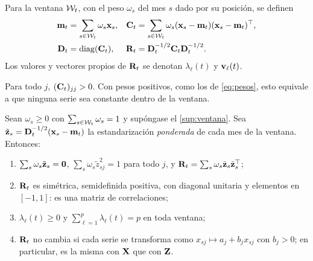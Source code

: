 \begin{definicion}\label{def:epca}
Para la ventana $\mathcal{W}_t$, con el peso $\omega_s$ del mes $s$ dado por su posición, se definen
\begin{equation}\label{eq:epca}
\begin{aligned}
  \mathbf{m}_t&=\sum_{s\in\mathcal{W}_t}\omega_s\mathbf{x}_s, &
  \mathbf{C}_t&=\sum_{s\in\mathcal{W}_t}\omega_s(\mathbf{x}_s-\mathbf{m}_t)(\mathbf{x}_s-\mathbf{m}_t)^{\top},\\
  \mathbf{D}_t&=\operatorname{diag}(\mathbf{C}_t), &
  \mathbf{R}_t&=\mathbf{D}_t^{-1/2}\mathbf{C}_t\mathbf{D}_t^{-1/2}.
\end{aligned}
\end{equation}
Los valores y vectores propios de $\mathbf{R}_t$ se denotan $\lambda_\ell(t)$ y $\mathbf{v}_\ell(t)$.
\end{definicion}

\begin{supuesto}\label{sup:ventana}
Para todo $j$, $(\mathbf{C}_t)_{jj}>0$. Con pesos positivos, como los de \cref{eq:pesos}, esto equivale a
que ninguna serie sea constante dentro de la ventana.
\end{supuesto}

\begin{proposicion}\label{prop:epca}
Sean $\omega_s\ge0$ con $\sum_{s\in\mathcal{W}_t}\omega_s=1$ y supóngase el \cref{sup:ventana}. Sea
$\tilde{\mathbf{z}}_s=\mathbf{D}_t^{-1/2}(\mathbf{x}_s-\mathbf{m}_t)$ la estandarización \emph{ponderada} de cada mes de la
ventana. Entonces:
\begin{enumerate}[label=(\alph*)]
  \item $\sum_s\omega_s\tilde{\mathbf{z}}_s=\mathbf{0}$, $\sum_s\omega_s\tilde z_{sj}^2=1$ para todo $j$, y
    $\mathbf{R}_t=\sum_s\omega_s\tilde{\mathbf{z}}_s\tilde{\mathbf{z}}_s^{\top}$;
  \item $\mathbf{R}_t$ es simétrica, semidefinida positiva, con diagonal unitaria y elementos en
    $[-1,1]$: es una matriz de correlaciones;
  \item $\lambda_\ell(t)\ge0$ y $\sum_{\ell=1}^{p}\lambda_\ell(t)=p$ en toda ventana;
  \item $\mathbf{R}_t$ no cambia si cada serie se transforma como $x_{sj}\mapsto a_j+b_jx_{sj}$ con
    $b_j>0$; en particular, es la misma con $\mathbf{X}$ que con $\mathbf{Z}$.
\end{enumerate}
\end{proposicion}

